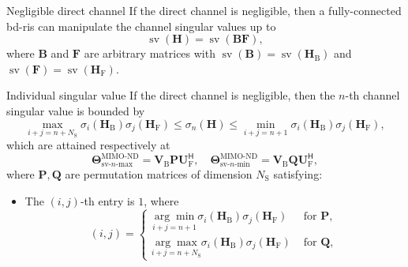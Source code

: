 \documentclass[final,xcolor={table}]{beamer}
\DeclareMathOperator{\sv}{sv}
\newlength{\colwidth}
\begin{document}
\begin{frame}[t]
\begin{columns}[t]
\begin{column}{\colwidth}
			\begin{prop}{Negligible direct channel}{}
				\setlength{\leftskip}{\leftmargini}
				\setlength{\rightskip}{\leftmargini}
				If the direct channel is negligible, then a fully-connected \gls{bd}-\gls{ris} can manipulate the channel singular values up to
				\begin{equation*}
					\sv(\mathbf{H}) = \sv(\mathbf{BF}),
				\end{equation*}
				where $\mathbf{B}$ and $\mathbf{F}$ are arbitrary matrices with $\sv(\mathbf{B})=\sv(\mathbf{H}_\mathrm{B})$ and $\sv(\mathbf{F})=\sv(\mathbf{H}_\mathrm{F})$.
			\end{prop}

			\setcounter{coro}{2}

			\begin{coro}{Individual singular value}{}
				\setlength{\leftskip}{\leftmargini}
				\setlength{\rightskip}{\leftmargini}
				If the direct channel is negligible,
				then the $n$-th channel singular value is bounded by
				\begin{equation*}
					\max_{i+j=n+N_\mathrm{S}} \sigma_i(\mathbf{H}_\mathrm{B}) \sigma_j(\mathbf{H}_\mathrm{F}) \le \sigma_n(\mathbf{H}) \le \min_{i+j=n+1} \sigma_i(\mathbf{H}_\mathrm{B}) \sigma_j(\mathbf{H}_\mathrm{F}),
				\end{equation*}
				which are attained respectively at
				\begin{equation*}
					\mathbf{\Theta}_{\text{sv-}n\text{-max}}^\text{MIMO-ND} = \mathbf{V}_\mathrm{B} \mathbf{P} \mathbf{U}_\mathrm{F}^\mathsf{H}, \quad \mathbf{\Theta}_{\text{sv-}n\text{-min}}^\text{MIMO-ND} = \mathbf{V}_\mathrm{B} \mathbf{Q} \mathbf{U}_\mathrm{F}^\mathsf{H},
				\end{equation*}
				where $\mathbf{P}, \mathbf{Q}$ are permutation matrices of dimension $N_\mathrm{S}$ satisfying:
				\begin{itemize}\color{black}
					\item The $(i, j)$-th entry is $1$, where
					\begin{equation*}
						(i, j) =
						\begin{cases}
							\underset{i+j=n+1}{\arg\min} \sigma_i(\mathbf{H}_\mathrm{B}) \sigma_j(\mathbf{H}_\mathrm{F}) & \text{ for } \mathbf{P}, \\
							\underset{i+j=n+N_\mathrm{S}}{\arg\max} \sigma_i(\mathbf{H}_\mathrm{B}) \sigma_j(\mathbf{H}_\mathrm{F}) & \text{ for } \mathbf{Q},
						\end{cases}
					\end{equation*}

\end{itemize}
\end{coro}
\end{column}
\end{columns}
\end{frame}
\end{document}
